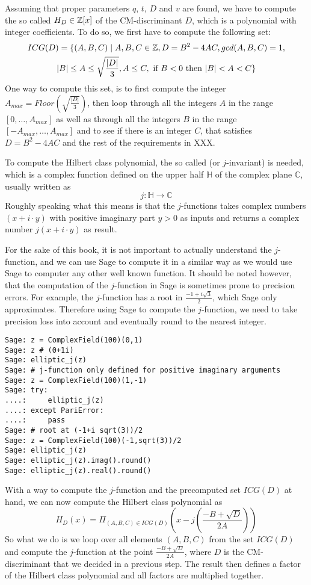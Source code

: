 Assuming that proper parameters $q$, $t$, $D$ and $v$ are found, we have to compute the so called  $H_D\in \mathbb{Z}[x]$ of the CM-discriminant $D$, which is a polynomial with integer coefficients. To do so, we first have to compute the following set:
\begin{multline*}
ICG(D)=\{(A,B,C)\;|\; A,B,C\in\mathbb{Z}, D = B^2-4AC, gcd(A,B,C)=1, \\
|B|\leq A \leq \sqrt{\frac{|D|}{3}}, A\leq C, 
\text{ if } B< 0 \text{ then } |B| < A < C\}
\end{multline*} 
One way to compute this set, is to first compute the integer $A_{max}= Floor(\sqrt{\frac{|D|}{3}})$, then loop through all the integers $A$ in the range $[0,\ldots,A_{max}]$ as well as through all the integers $B$ in the range $[-A_{max},\ldots,A_{max}]$ and to see if there is an integer $C$, that satisfies $D = B^2-4AC$ and the rest of the requirements in XXX.

To compute the Hilbert class polynomial, the so called  (or $j$-invariant) is needed, which is a complex function defined on the upper half $\mathbb{H}$ of the complex plane $\mathbb{C}$, usually written as
\begin{equation}
j: \mathbb{H} \to \mathbb{C}
\end{equation}
Roughly speaking what this means is that the $j$-functions takes complex numbers 
$(x +i\cdot y)$ with positive imaginary part $y>0$ as inputs and returns a complex number $j(x+i\cdot y)$ as result.

For the sake of this book, it is not important to actually understand the $j$-function, and we can use Sage to compute it in a similar way as we would use Sage to computer any other well known function. It should be noted however, that the computation of the $j$-function in Sage is sometimes prone to precision errors. For example, the $j$-function has a root in $\frac{-1+i\sqrt{3}}{2}$, which Sage only approximates. Therefore using Sage to compute the $j$-function, we need to take precision loss into account and eventually round to the nearest integer.
\begin{verbatim}
Sage: z = ComplexField(100)(0,1)
Sage: z # (0+1i)
Sage: elliptic_j(z)
Sage: # j-function only defined for positive imaginary arguments
Sage: z = ComplexField(100)(1,-1)
Sage: try:
....:     elliptic_j(z)
....: except PariError:
....:     pass
Sage: # root at (-1+i sqrt(3))/2
Sage: z = ComplexField(100)(-1,sqrt(3))/2
Sage: elliptic_j(z)
Sage: elliptic_j(z).imag().round()
Sage: elliptic_j(z).real().round()
\end{verbatim}
With a way to compute the $j$-function and the precomputed set $ICG(D)$ at hand, we can now compute the Hilbert class polynomial as
\begin{equation}
H_D(x) = \Pi_{(A,B,C)\in ICG(D)} \left(x - j\left(\frac{-B + \sqrt{D}}{2A}\right)\right)
\end{equation}
So what we do is we loop over all elements $(A,B,C)$ from the set $ICG(D)$ and compute the $j$-function at the point $\frac{-B + \sqrt{D}}{2A}$, where $D$ is the CM-discriminant that we decided in a previous step. The result then defines a factor of the Hilbert class polynomial and all factors are multiplied together.

